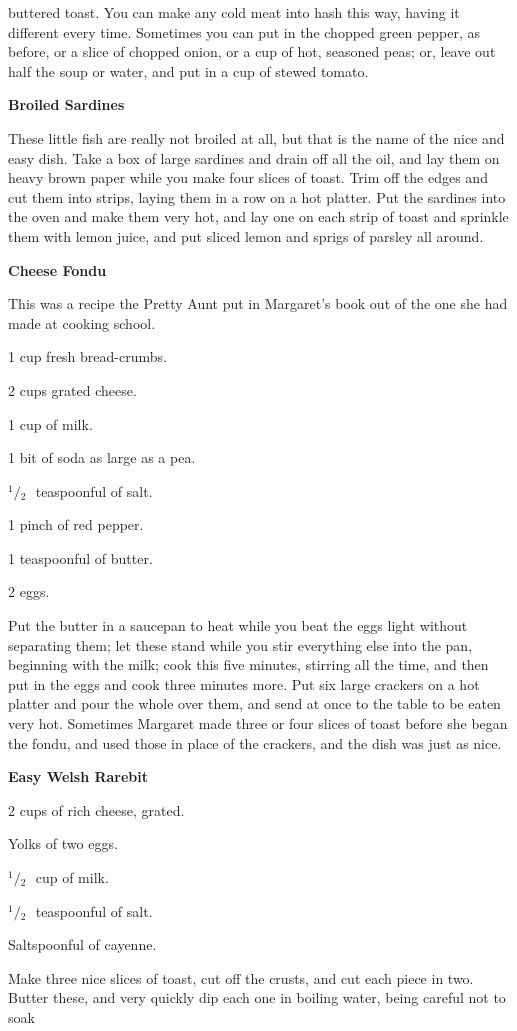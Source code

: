\documentclass[11pt]{book}
\newcommand{\indpar}{\par\noindent\hspace*{\parindent}}
\newcommand{\ingredient}{\indpar}
\newcommand{\instruction}{\indpar}
\newcommand{\OneHalf}{\ensuremath{{}^1\!\!/\!{}_2\mbox{\ }}}
\newenvironment{RecipeTitle}{\medskip\begin{center}\large\bf }{\end{center}\smallskip}
\begin{document}
buttered toast.  You can make any cold meat into hash
this way, having it different every time.  Sometimes you
can put in the chopped green pepper, as before, or a
slice of chopped onion, or a cup of hot, seasoned peas;
or, leave out half the soup or water, and put in a cup
of stewed tomato.
\begin{RecipeTitle}
Broiled Sardines\label{broiled_sardines}
\end{RecipeTitle}
\instruction
  These little fish are really not broiled at all, but
that is the name of the nice and easy dish.  Take a box
of large sardines and drain off all the oil, and lay them
on heavy brown paper while you make four slices of toast.
Trim off the edges and cut them into strips, laying them
in a row on a hot platter.  Put the sardines into the
oven and make them very hot, and lay one on each strip
of toast and sprinkle them with lemon juice, and put
sliced lemon and sprigs of parsley all around.
\begin{RecipeTitle}
Cheese Fondu\label{cheese_fondu}
\end{RecipeTitle}
\instruction
  This was a recipe the Pretty Aunt put in Margaret's
book out of the one she had made at cooking school.
\ingredient  1 cup fresh bread-crumbs.
\ingredient  2 cups grated cheese.
\ingredient  1 cup of milk.
\ingredient  1 bit of soda as large as a pea.
\ingredient  \OneHalf teaspoonful of salt.
\ingredient  1 pinch of red pepper.
\ingredient  1 teaspoonful of butter.
\ingredient  2 eggs.
\instruction
  Put the butter in a saucepan to heat while you beat
the eggs light without separating them; let these stand
while you stir everything else into the pan, beginning
with the milk; cook this five minutes, stirring all the
time, and then put in the eggs and cook three minutes
more.  Put six large crackers on a hot platter and pour
the whole over them, and send at once to the table to
be eaten very hot.  Sometimes Margaret made three or
four slices of toast before she began the fondu, and
used those in place of the crackers, and the dish was
just as nice.
\begin{RecipeTitle}
Easy Welsh Rarebit\label{easy_welsh_rarebit}
\end{RecipeTitle}
\ingredient  2 cups of rich cheese, grated.
\ingredient  Yolks of two eggs.
\ingredient  \OneHalf cup of milk.
\ingredient  \OneHalf teaspoonful of salt.
\ingredient  Saltspoonful of cayenne.
\instruction
  Make three nice slices of toast, cut off the crusts,
and cut each piece in two.  Butter these, and very quickly
dip each one in boiling water, being careful not to soak
\end{document}
